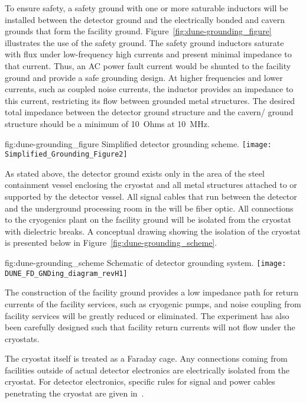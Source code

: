 To ensure safety, a safety ground with one or more saturable inductors
will be installed between the detector ground and the electrically
bonded  and cavern grounds that form the facility ground.
Figure~\ref{fig:dune-grounding_figure} illustrates the use of the
safety ground. The safety ground inductors saturate with flux under
low-frequency high currents and present minimal impedance to that
current.  Thus, an AC power fault current would be shunted to the
facility ground and provide a safe grounding design. At higher
frequencies and lower currents, such as coupled noise currents, the
inductor provides an impedance to this current, restricting its flow
between grounded metal structures. The desired total impedance between
the detector ground structure and the cavern/ ground
structure should be a minimum of \SI{10}{Ohms} at \SI{10}{MHz}.
\begin{dunefigure}{fig:dune-grounding_figure}
  {Simplified detector grounding scheme.}
  \texttt{[image: Simplified\_Grounding\_Figure2]}
\end{dunefigure}

As stated above, the detector ground exists only in the area of the
steel containment vessel enclosing the cryostat and all metal
structures attached to or supported by the detector vessel.  All
signal cables that run between the detector and the  underground
processing room in the  will be fiber optic.
All connections to the cryogenics plant on the facility
ground will be isolated from the cryostat with dielectric breaks.  A
conceptual drawing showing the isolation of the cryostat is presented
below in Figure~\ref{fig:dune-grounding_scheme}.
\begin{dunefigure}{fig:dune-grounding_scheme}
  {Schematic of detector grounding system.}
  \texttt{[image: DUNE\_FD\_GNDing\_diagram\_revH1]}
\end{dunefigure}

The construction of the facility ground provides a low impedance path
for return currents of the facility services, such as cryogenic pumps,
and noise coupling from facility services will be greatly reduced or
eliminated.  The experiment has also been carefully designed such that
facility return currents will not flow under the cryostats.

The cryostat itself is treated as a Faraday cage.  Any connections
coming from facilities outside of actual detector electronics are
electrically isolated from the cryostat.  For detector electronics,
specific rules for signal and power cables penetrating the cryostat
are given in~\cite{bib:cernedms2095958}. %





